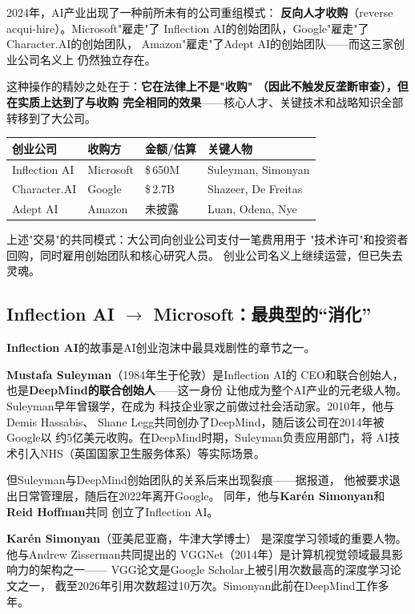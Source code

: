 2024年，AI产业出现了一种前所未有的公司重组模式：
\textbf{反向人才收购}（reverse acqui-hire）。Microsoft"雇走"了
Inflection AI的创始团队，Google"雇走"了Character.AI的创始团队，
Amazon"雇走"了Adept AI的创始团队——而这三家创业公司名义上
仍然独立存在。

这种操作的精妙之处在于：\textbf{它在法律上不是"收购"
（因此不触发反垄断审查），但在实质上达到了与收购
完全相同的效果}——核心人才、关键技术和战略知识全部
转移到了大公司。

\begin{corebox}
\begin{center}
\begin{tabular}{llll}
\toprule
\textbf{创业公司} & \textbf{收购方} & \textbf{金额/估算} & \textbf{关键人物} \\
\midrule
Inflection AI & Microsoft & \$\,650M & Suleyman, Simonyan \\
Character.AI & Google & \$\,2.7B & Shazeer, De Freitas \\
Adept AI & Amazon & 未披露 & Luan, Odena, Nye \\
\bottomrule
\end{tabular}
\end{center}
上述"交易"的共同模式：大公司向创业公司支付一笔费用用于
"技术许可"和投资者回购，同时雇用创始团队和核心研究人员。
创业公司名义上继续运营，但已失去灵魂。
\end{corebox}

\subsection{Inflection AI $\to$ Microsoft：最典型的``消化''}

\textbf{Inflection AI}的故事是AI创业泡沫中最具戏剧性的章节之一。

\textbf{Mustafa Suleyman}（1984年生于伦敦）是Inflection AI的
CEO和联合创始人，也是\textbf{DeepMind的联合创始人}——这一身份
让他成为整个AI产业的元老级人物。Suleyman早年曾辍学，在成为
科技企业家之前做过社会活动家。2010年，他与Demis Hassabis、
Shane Legg共同创办了DeepMind，随后该公司在2014年被Google以
约5亿美元收购。在DeepMind时期，Suleyman负责应用部门，将
AI技术引入NHS（英国国家卫生服务体系）等实际场景。

但Suleyman与DeepMind创始团队的关系后来出现裂痕——据报道，
他被要求退出日常管理层，随后在2022年离开Google。
同年，他与\textbf{Kar\'{e}n Simonyan}和\textbf{Reid Hoffman}共同
创立了Inflection AI。

\textbf{Kar\'{e}n Simonyan}（亚美尼亚裔，牛津大学博士）
是深度学习领域的重要人物。他与Andrew Zisserman共同提出的
VGGNet（2014年）是计算机视觉领域最具影响力的架构之一——
VGG论文是Google Scholar上被引用次数最高的深度学习论文之一，
截至2026年引用次数超过10万次。Simonyan此前在DeepMind工作多年。

